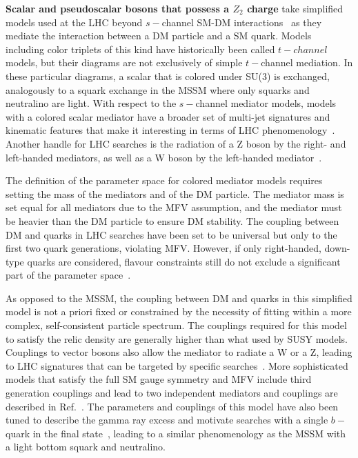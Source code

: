 \textbf{Scalar and pseudoscalar bosons that possess a $Z_2$ charge} take simplified models used at the LHC beyond $s-$channel SM-DM interactions~\cite{Bai:2013iqa, Papucci:2014iwa, An:2013xka, Bell:2012rg} as they mediate the interaction between a DM particle and a SM quark. Models including color triplets of this kind have historically been called $t-channel$ models, but their diagrams are not exclusively of simple $t-$channel mediation. In these particular diagrams, a scalar that is colored under SU(3) is exchanged, analogously to a squark exchange in the MSSM where only squarks and neutralino are light.
With respect to the $s-$channel mediator models, models with a colored scalar mediator have a broader set of multi-jet signatures and kinematic features that make it interesting in terms of LHC phenomenology~\cite{Abercrombie:2015wmb}. %
Another handle for LHC searches is the radiation of a Z boson by the right- and left-handed mediators, as well as a W boson by the left-handed mediator~\cite{Bell:2012rg}. 

The definition of the parameter space for colored mediator models requires setting the mass of the mediators and of the DM particle. The mediator mass is set equal for all mediators due to the MFV assumption, and the mediator must be heavier than the DM particle to ensure DM stability. 
The coupling between DM and quarks \gdmq in LHC searches have been set to be universal but only to the first two quark generations, violating MFV. 
However, if only right-handed, down-type quarks are considered, flavour constraints still do not exclude a significant part of the parameter space~\cite{Abercrombie:2015wmb}. 

As opposed to the MSSM, the coupling between DM and quarks in this simplified model is not a priori fixed or constrained by the necessity of fitting within a more complex, self-consistent particle spectrum. The couplings required for this model to satisfy the relic density are generally higher than what used by SUSY models. 
Couplings to vector bosons also allow the mediator to radiate a W or a Z, leading to LHC signatures that can be targeted by specific searches~\cite{Bell:2012rg}. 
More sophisticated models that satisfy the full SM gauge symmetry and MFV include third generation couplings and lead to two independent mediators and couplings are described in Ref.~\cite{Ko:2016zxg}. 
The parameters and couplings of this model have also been tuned to describe the gamma ray excess and motivate searches with a single $b-$quark in the final state~\cite{Agrawal:2014una}, leading to a similar phenomenology as the MSSM with a light bottom squark and neutralino. 

